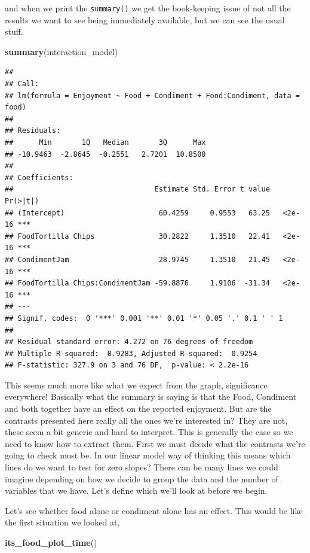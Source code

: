 \documentclass[
]{book}
\newenvironment{Shaded}{\begin{snugshade}}{\end{snugshade}}
\newcommand{\KeywordTok}[1]{\textcolor[rgb]{0.13,0.29,0.53}{\textbf{#1}}}
\newcommand{\NormalTok}[1]{#1}
\begin{document}
and when we print the \texttt{summary()} we get the book-keeping issue of not all the results we want to see being immediately available, but we can see the usual stuff.

\begin{Shaded}
\begin{Highlighting}[]
\KeywordTok{summary}\NormalTok{(interaction_model)}
\end{Highlighting}
\end{Shaded}

\begin{verbatim}
## 
## Call:
## lm(formula = Enjoyment ~ Food + Condiment + Food:Condiment, data = food)
## 
## Residuals:
##      Min       1Q   Median       3Q      Max 
## -10.9463  -2.8645  -0.2551   2.7201  10.8500 
## 
## Coefficients:
##                                 Estimate Std. Error t value Pr(>|t|)    
## (Intercept)                      60.4259     0.9553   63.25   <2e-16 ***
## FoodTortilla Chips               30.2822     1.3510   22.41   <2e-16 ***
## CondimentJam                     28.9745     1.3510   21.45   <2e-16 ***
## FoodTortilla Chips:CondimentJam -59.8876     1.9106  -31.34   <2e-16 ***
## ---
## Signif. codes:  0 '***' 0.001 '**' 0.01 '*' 0.05 '.' 0.1 ' ' 1
## 
## Residual standard error: 4.272 on 76 degrees of freedom
## Multiple R-squared:  0.9283,	Adjusted R-squared:  0.9254 
## F-statistic: 327.9 on 3 and 76 DF,  p-value: < 2.2e-16
\end{verbatim}

This seems much more like what we expect from the graph, significance everywhere! Basically what the summary is saying is that the Food, Condiment and both together have an effect on the reported enjoyment. But are the contrasts presented here really all the ones we're interested in? They are not, these seem a bit generic and hard to interpret. This is generally the case so we need to know how to extract them. First we must decide what the contrasts we're going to check must be. In our linear model way of thinking this means which lines do we want to test for zero slopes? There can be many lines we could imagine depending on how we decide to group the data and the number of variables that we have. Let's define which we'll look at before we begin.

Let's see whether food alone or condiment alone has an effect. This would be like the first situation we looked at,

\begin{Shaded}
\begin{Highlighting}[]
\KeywordTok{its_food_plot_time}\NormalTok{()}
\end{Highlighting}
\end{Shaded}
\end{document}
